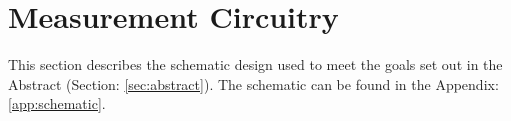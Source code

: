 \section {Measurement Circuitry}
\label{sec:measCirc}
This section describes the schematic design used to meet the goals set out in the Abstract (Section: \ref{sec:abstract}). The schematic can be found in the Appendix: \ref{app:schematic}.

\nocite{my_ieeePaper}









